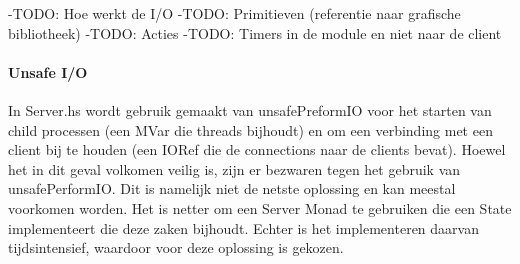 -TODO: Hoe werkt de I/O
-TODO: Primitieven (referentie naar grafische bibliotheek)
-TODO: Acties
-TODO: Timers in de module en niet naar de client

\paragraph{Unsafe I/O}
In Server.hs wordt gebruik gemaakt van unsafePreformIO voor het starten van child processen (een MVar die threads bijhoudt) en om een verbinding met een client bij te houden (een IORef die de connections naar de clients bevat). Hoewel het in dit geval volkomen veilig is, zijn er bezwaren tegen het gebruik van unsafePerformIO\cite{Haskell.org2008}. Dit is namelijk niet de netste oplossing en kan meestal voorkomen worden. Het is netter om een Server Monad te gebruiken die een State implementeert die deze zaken bijhoudt. Echter is het implementeren daarvan tijdsintensief, waardoor voor deze oplossing is gekozen.